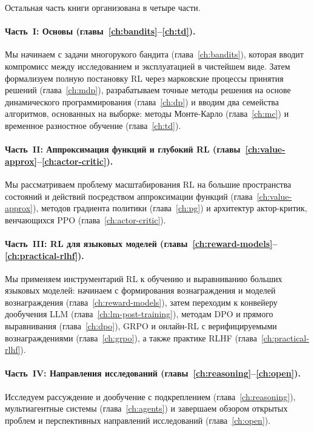 Остальная часть книги организована в четыре части.

\paragraph{Часть~I: Основы (главы~\ref{ch:bandits}--\ref{ch:td}).}
Мы начинаем с задачи многорукого бандита (глава~\ref{ch:bandits}), которая вводит компромисс между исследованием и эксплуатацией в чистейшем виде.  Затем формализуем полную постановку RL через марковские процессы принятия решений (глава~\ref{ch:mdp}), разрабатываем точные методы решения на основе динамического программирования (глава~\ref{ch:dp}) и вводим два семейства алгоритмов, основанных на выборке: методы Монте-Карло (глава~\ref{ch:mc}) и временное разностное обучение (глава~\ref{ch:td}).

\paragraph{Часть~II: Аппроксимация функций и глубокий RL (главы~\ref{ch:value-approx}--\ref{ch:actor-critic}).}
Мы рассматриваем проблему масштабирования RL на большие пространства состояний и действий посредством аппроксимации функций (глава~\ref{ch:value-approx}), методов градиента политики (глава~\ref{ch:pg}) и архитектур актор-критик, венчающихся PPO (глава~\ref{ch:actor-critic}).

\paragraph{Часть~III: RL для языковых моделей (главы~\ref{ch:reward-models}--\ref{ch:practical-rlhf}).}
Мы применяем инструментарий RL к обучению и выравниванию больших языковых моделей: начинаем с формирования вознаграждения и моделей вознаграждения (глава~\ref{ch:reward-models}), затем переходим к конвейеру дообучения LLM (глава~\ref{ch:lm-post-training}), методам DPO и прямого выравнивания (глава~\ref{ch:dpo}), GRPO и онлайн-RL с верифицируемыми вознаграждениями (глава~\ref{ch:grpo}), а также практике RLHF (глава~\ref{ch:practical-rlhf}).

\paragraph{Часть~IV: Направления исследований (главы~\ref{ch:reasoning}--\ref{ch:open}).}
Исследуем рассуждение и дообучение с подкреплением (глава~\ref{ch:reasoning}), мультиагентные системы (глава~\ref{ch:agents}) и завершаем обзором открытых проблем и перспективных направлений исследований (глава~\ref{ch:open}).


